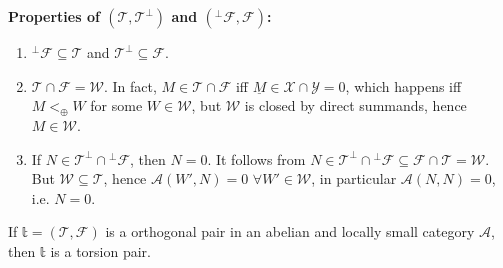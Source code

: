 \sepline

\bf Properties of $(\mathcal{T},\mathcal{T}^\perp)$ and $(^\perp\mathcal{F},\mathcal{F})$: \rm
\begin{enumerate}
  \item $^\perp\mathcal{F}\subseteq\mathcal{T}$ and $\mathcal{T}^\perp\subseteq \mathcal{F}$.
  \item $\mathcal{T}\cap\mathcal{F} = \mathcal{W}$.
  In fact, $M\in\mathcal{T}\cap\mathcal{F}$ iff $\underline{M}\in\mathcal{X}\cap\mathcal{Y}=0$, which happens iff $M<_\oplus W$ for some $W\in\mathcal{W}$,
  but $\mathcal{W}$ is closed by direct summands, hence $M\in\mathcal{W}$.
  \item If $N\in\mathcal{T}^\perp \cap{^\perp\mathcal{F}}$, then $N=0$. It follows from $N\in\mathcal{T}^\perp \cap{^\perp\mathcal{F}}\subseteq\mathcal{F}\cap\mathcal{T}=\mathcal{W}$. But $\mathcal{W}\subseteq\mathcal{T}$, hence $\mathcal{A}(W',N)=0$ $\forall W'\in\mathcal{W}$,
  in particular $\mathcal{A}(N,N)=0$, i.e. $N=0$.
\end{enumerate}

\sepline

If $\mathbb{t}=(\mathcal{T},\mathcal{F})$ is a orthogonal pair in an abelian and locally small category $\mathcal{A}$, then $\mathbb{t}$ is a torsion pair.

